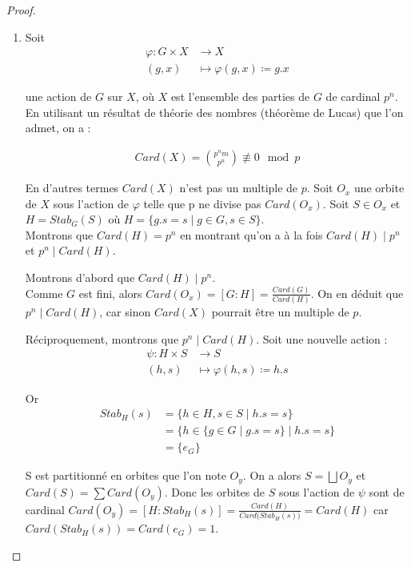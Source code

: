 \documentclass[french]{article}
\theoremstyle{definition}
\theoremstyle{plain}
\theoremstyle{plain}
\theoremstyle{plain}
\theoremstyle{plain}
\theoremstyle{plain}
\begin{document}
\begin{proof}
	\begin{enumerate}[label={\upshape(\roman*)}]
		\item 
Soit
\begin{align*}
	\varphi : G \times X &\to X \\
	(g,x) &\mapsto \varphi(g,x) \coloneq g.x
\end{align*}

une action de \( G \) sur \( X \), où \( X \) est l'ensemble des parties de \( G \) de cardinal \( p^{n} \). En utilisant un résultat de théorie des nombres (théorème de Lucas) que l'on admet, on a :

\begin{align*}
	Card(X) = \binom{p^{n}m}{p^{n}} \not\equiv 0 \mod  p 
\end{align*}


En d'autres termes \( Card(X) \) n'est pas un multiple de \( p \).
Soit \( O_{x} \) une orbite de \( X \) sous l'action de \( \varphi \) telle que  p ne divise pas \( Card(O_{x}) \). Soit \( S \in O_{x} \) et \( H = Stab_{G}({S}) \) où 
\( H = \{ g.s = s \mid g \in G, s \in S \} \). \\
Montrons que \( Card(H) = p^{n} \) en montrant qu'on a à la fois \( Card(H) \mid p^{n} \) et \( p^{n} \mid Card(H) \).

\par Montrons d'abord que \( Card(H) \mid p^{n} \). \\ 
Comme \( G \) est fini, alors \( Card(O_{x}) = [G : H]  = \frac{Card(G)}{Card(H)} \).
On en déduit que \( p^{n} \mid Card(H) \), car sinon \( Card(X) \) pourrait être un multiple de \( p \).

\par Réciproquement, montrons que \( p^{n} \mid Card(H) \). Soit une nouvelle action :
\begin{align*}
	\psi : H \times S &\to S \\
	(h,s) &\mapsto \varphi(h,s) \coloneq h.s
\end{align*}

Or 
\begin{align*}
	Stab_{H}({s}) &= \{ h \in H, s \in S \mid h.s = s \} \\ 
	&= \{ h \in \{g \in G \mid g.s = s \} \mid h.s = s \} \\
	&= \{e_{G}\} 
\end{align*}


S est partitionné en orbites que l'on note \( O_y \). On a alors \( S = \bigsqcup O_{y} \) et 
\( Card(S) = \sum Card(O_{y}) \).
Donc les orbites de \( S \) sous l'action de \( \psi \) sont de cardinal \( Card(O_y) = [H : Stab_{H}({s}) ] = \frac{Card(H)}{Card({Stab_{H}({s}))}} = Card(H) \) car \( Card(Stab_{H}({s})) = Card(e_{G}) = 1 \).


\end{enumerate}
\end{proof}
\end{document}
